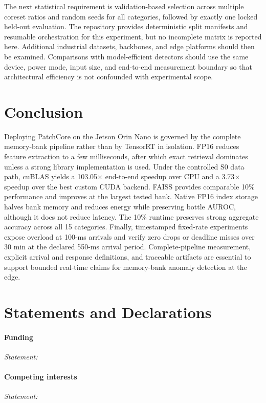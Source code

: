 \documentclass[twocolumn]{svjour3}
\newcommand{\blankfield}[1]{\textit{#1: }\underline{\hspace{3.0cm}}}
\begin{document}
The next statistical requirement is validation-based selection across multiple
coreset ratios and random seeds for all categories, followed by exactly one
locked held-out evaluation. The repository provides deterministic split
manifests and resumable orchestration for this experiment, but no incomplete
matrix is reported here. Additional industrial datasets, backbones, and edge
platforms should then be examined. Comparisons with model-efficient detectors
should use the same device, power mode, input size, and end-to-end measurement
boundary so that architectural efficiency is not confounded with experimental
scope.

\section{Conclusion}\label{sec:conclusion}
Deploying PatchCore on the Jetson Orin Nano is governed by the complete
memory-bank pipeline rather than by TensorRT in isolation. FP16 reduces feature
extraction to a few milliseconds, after which exact retrieval dominates unless
a strong library implementation is used. Under the controlled S0 data path,
cuBLAS yields a 103.05$\times$ end-to-end speedup over CPU and a 3.73$\times$
speedup over the best custom CUDA backend. FAISS provides comparable 10\%
performance and improves at the largest tested bank. Native FP16 index storage
halves bank memory and reduces energy while preserving bottle AUROC, although
it does not reduce latency. The 10\% runtime preserves strong aggregate
accuracy across all 15 categories. Finally, timestamped fixed-rate experiments
expose overload at 100-ms arrivals and verify zero drops or deadline misses over
30 min at the declared 550-ms arrival period. Complete-pipeline measurement,
explicit arrival and response definitions, and traceable artifacts are
essential to support bounded real-time claims for memory-bank anomaly detection
at the edge.

\section*{Statements and Declarations}
\paragraph{Funding} \blankfield{Statement}

\paragraph{Competing interests} \blankfield{Statement}
\end{document}
